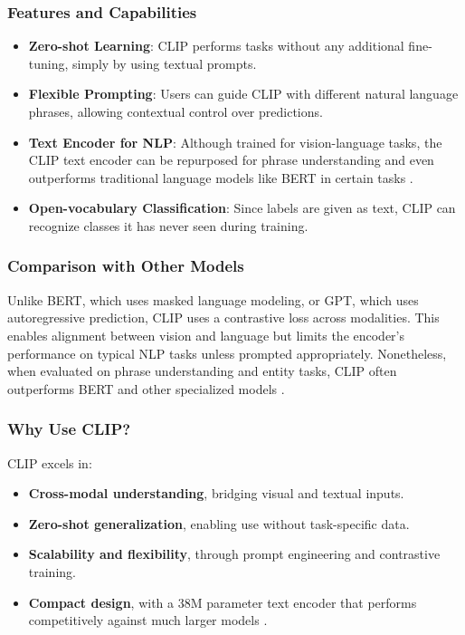 \subsubsection{Features and Capabilities}
\begin{itemize}
    \item \textbf{Zero-shot Learning}: CLIP performs tasks without any additional fine-tuning, simply by using textual prompts.
    \item \textbf{Flexible Prompting}: Users can guide CLIP with different natural language phrases, allowing contextual control over predictions.
    \item \textbf{Text Encoder for NLP}: Although trained for vision-language tasks, the CLIP text encoder can be repurposed for phrase understanding and even outperforms traditional language models like BERT in certain tasks \cite{yan2022clipunderstandstextprompting}.
    \item \textbf{Open-vocabulary Classification}: Since labels are given as text, CLIP can recognize classes it has never seen during training.
\end{itemize}

\subsubsection{Comparison with Other Models}
Unlike BERT, which uses masked language modeling, or GPT, which uses autoregressive prediction, CLIP uses a contrastive loss across modalities. This enables alignment between vision and language but limits the encoder's performance on typical NLP tasks unless prompted appropriately. Nonetheless, when evaluated on phrase understanding and entity tasks, CLIP often outperforms BERT and other specialized models \cite{yan2022clipunderstandstextprompting}.

\subsubsection{Why Use CLIP?}
CLIP excels in:
\begin{itemize}
    \item \textbf{Cross-modal understanding}, bridging visual and textual inputs.
    \item \textbf{Zero-shot generalization}, enabling use without task-specific data.
    \item \textbf{Scalability and flexibility}, through prompt engineering and contrastive training.
    \item \textbf{Compact design}, with a 38M parameter text encoder that performs competitively against much larger models \cite{yan2022clipunderstandstextprompting}.
\end{itemize}

